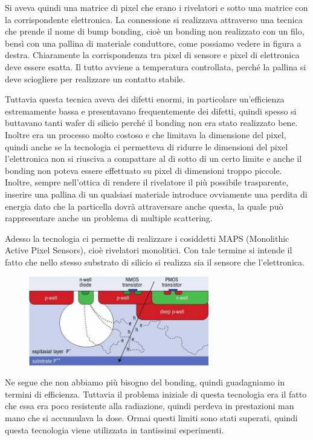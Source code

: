 Si aveva quindi una matrice di pixel che erano i rivelatori e sotto una matrice con la corrispondente elettronica. La connessione si realizzava attraverso una tecnica che prende il nome di bump bonding, cioè un bonding non realizzato con un filo, bensì con una pallina di materiale conduttore, come possiamo vedere in figura a destra. Chiaramente la corrispondenza tra pixel di sensore e pixel di elettronica deve essere esatta. Il tutto avviene a temperatura controllata, perché la pallina si deve sciogliere per realizzare un contatto stabile.

Tuttavia questa tecnica aveva dei difetti enormi, in particolare un'efficienza estremamente bassa e presentavano frequentemente dei difetti, quindi spesso si buttavano tanti wafer di silicio perché il bonding non era stato realizzato bene. Inoltre era un processo molto costoso e che limitava la dimensione del pixel, quindi anche se la tecnologia ci permetteva di ridurre le dimensioni del pixel l'elettronica non si riusciva a compattare al di sotto di un certo limite e anche il bonding non poteva essere effettuato su pixel di dimensioni troppo piccole. Inoltre, sempre nell'ottica di rendere il rivelatore il più possibile trasparente, inserire una pallina di un qualsiasi materiale introduce ovviamente una perdita di energia dato che la particella dovrà attraversare anche questa, la quale può rappresentare anche un problema di multiple scattering.

Adesso la tecnologia ci permette di realizzare i cosiddetti MAPS (Monolithic Active Pixel Sensors), cioè rivelatori monolitici. Con tale termine si intende il fatto che nello stesso substrato di silicio si realizza sia il sensore che l'elettronica.
\begin{figure}[H]
   \centering
   \includegraphics[width=0.7\textwidth]{immagini/rivelatore_monolitico.png}
\end{figure}
Ne segue che non abbiamo più bisogno del bonding, quindi guadagniamo in termini di efficienza. Tuttavia il problema iniziale di questa tecnologia era il fatto che essa era poco resistente alla radiazione, quindi perdeva in prestazioni man mano che si accumulava la dose. Ormai questi limiti sono stati superati, quindi questa tecnologia viene utilizzata in tantissimi esperimenti.
